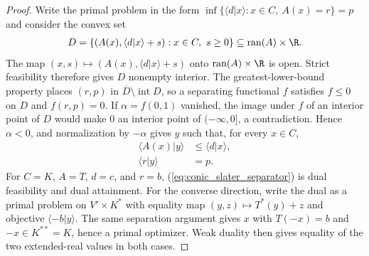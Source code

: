 \begin{proof}
    \leanok
    Write the primal problem in the form
    $\inf\{\langle d|x\rangle:x\in C,\ A(x)=r\}=p$ and consider the convex
    set
    \begin{align}
        D=\{(A(x),\langle d|x\rangle+s):x\in C,\ s\geq0\}
        \subseteq\operatorname{ran}(A)\times\R.
        \label{eq:conic_slater_epigraph}
    \end{align}
    The map $(x,s)\mapsto(A(x),\langle d|x\rangle+s)$ onto
    $\operatorname{ran}(A)\times\R$ is open.  Strict feasibility therefore
    gives $D$ nonempty interior.  The greatest-lower-bound property places
    $(r,p)$ in $\overline D\setminus\operatorname{int}D$, so a separating
    functional $f$ satisfies $f\leq0$ on $D$ and $f(r,p)=0$.  If
    $\alpha=f(0,1)$ vanished, the image under $f$ of an interior point of $D$
    would make $0$ an interior point of $(-\infty,0]$, a contradiction.
    Hence $\alpha<0$, and normalization by $-\alpha$ gives $y$ such that,
    for every $x\in C$,
    \begin{align}
        \langle A(x)|y\rangle & \leq\langle d|x\rangle, \\
        \langle r|y\rangle    & =p.
        \label{eq:conic_slater_separator}
    \end{align}
    For $C=K$, $A=T$, $d=c$, and $r=b$,
    (\ref{eq:conic_slater_separator}) is dual feasibility and dual attainment.
    For the converse direction, write the dual as a primal problem on
    $V'\times K^*$ with equality map $(y,z)\mapsto T^*(y)+z$ and objective
    $\langle-b|y\rangle$.  The same separation argument gives $x$ with
    $T(-x)=b$ and $-x\in K^{**}=K$, hence a primal optimizer.  Weak duality
    then gives equality of the two extended-real values in both cases.
\end{proof}

